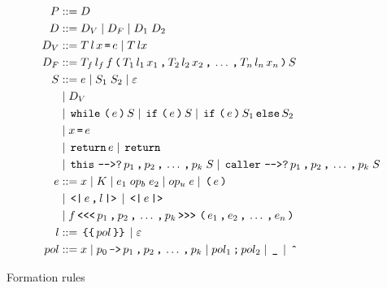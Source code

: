 \begin{table}
  \begin{align*}
    P         & ::= D \\
    D         & ::= D_V \gp D_F \gp D_1 \; D_2 \\
    D_V       & ::= T \, l \, x \tk = e \gp T \, l x \\
    D_F       & ::= T_f \, l_f \, f \tk ( T_1 \, l_1 \, x_1 \tk , T_2 \, l_2 \, x_2 \tk , \dots \tk , T_n \, l_n \, x_n \tk ) S \\
    S         & ::= e \gp S_1 \; S_2 \gp \varepsilon \\
              & \gp D_V \\
              & \gp \tk{while} \tk ( e \tk ) S \gp \tk{if} \tk ( e \tk ) S \gp \tk{if} \tk ( e \tk ) S_1 \tk{else} S_2 \\
              & \gp x \tk = e \\
              & \gp \tk{return} e \gp \tk{return} \\
              & \gp \tk{this} \tk{-{}->?} p_1 \tk , p_2 \tk , \dots \tk , p_k \; S \gp \tk{caller} \tk{-{}->?} p_1 \tk , p_2 \tk , \dots \tk , p_k \; S \\
    e         & ::= x \gp K \gp e_1 \; op_b \; e_2 \gp op_u \; e \gp \tk ( e \tk ) \\
              & \gp \tk{<|} e \tk , l \tk{|>} \gp \tk{<|} e \tk{|>} \\
              & \gp f \tk{<{}<{}<} p_1 \tk , p_2 \tk , \dots \tk , p_k \tk{>{}>{}>} \tk ( e_1 \tk , e_2 \tk , \dots \tk , e_n \tk ) \\
    l         & ::= \tk{\{\{} pol \tk{\}\}} \gp \varepsilon \\
    pol       & ::= x \gp p_0 \tk{->} p_1 \tk , p_2 \tk , \dots \tk , p_k \gp pol_1 \tk ; pol_2 \gp \tk \_ \gp \tk{\^{}}
  \end{align*}
  \caption{Formation rules}
  \label{ctif:rules}
\end{table}
